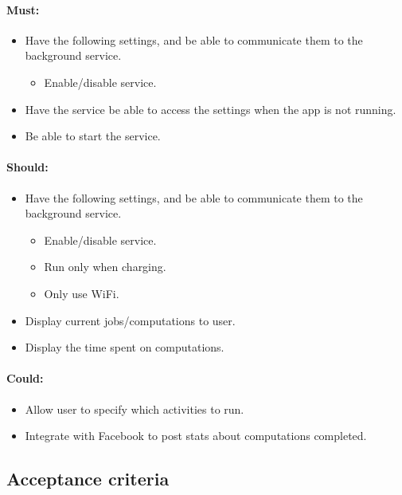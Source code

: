 \documentclass[a4paper,10pt]{article}
\begin{document}
\paragraph{Must:}

\begin{itemize}
\item Have the following settings, and be able to communicate them to the background service.
\begin{itemize}
\item Enable/disable service.
\end{itemize}
\item Have the service be able to access the settings when the app is not running.
\item Be able to start the service.
\end{itemize}

\paragraph{Should:}

\begin{itemize}
\item Have the following settings, and be able to communicate them to the background service.
\begin{itemize}
\item Enable/disable service.
\item Run only when charging.
\item Only use WiFi.
\end{itemize}
\item Display current jobs/computations to user.
\item Display the time spent on computations.
\end{itemize}

\paragraph{Could:}

\begin{itemize}
\item Allow user to specify which activities to run.
\item Integrate with Facebook to post stats about computations completed.
\end{itemize}

\subsection{Acceptance criteria}
\end{document}
